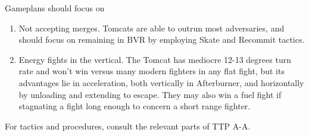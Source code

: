 Gameplans should focus on
{
 \setlength\parskip{0em}
 \begin{enumerate}[label=\alph*)]

   \item Not accepting merges. Tomcats are able to outrun most adversaries,
    and should focus on remaining in BVR by employing Skate and Recommit
    tactics.

   \item Energy fights in the vertical. The Tomcat has mediocre 12-13 degrees
     turn rate and won't win versus many modern fighters in any flat fight, but
     its advantages lie in acceleration, both vertically in Afterburner, and
     horizontally by unloading and extending to escape. They may also win a
     fuel fight if stagnating a fight long enough to concern a short range
     fighter.

 \end{enumerate}
}

For tactics and procedures, consult the relevant parts of TTP A-A.
